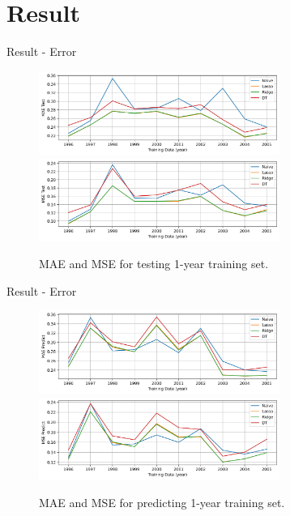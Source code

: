 \documentclass{beamer}
\begin{document}
\section{Result}

\begin{frame}{Result - Error}

  \begin{figure}[H]
    \centering
    \includegraphics[width=0.7\textwidth]{../Result/Res-1_MAE_test.jpg} \\
    \includegraphics[width=0.7\textwidth]{../Result/Res-1_MSE_test.jpg}
    \caption{MAE and MSE for testing 1-year training set.}
  \end{figure}

\end{frame}

\begin{frame}{Result - Error}

  \begin{figure}[H]
    \centering
    \includegraphics[width=0.7\textwidth]{../Result/Res-1_MAE_pred.jpg} \\
    \includegraphics[width=0.7\textwidth]{../Result/Res-1_MSE_pred.jpg}
    \caption{MAE and MSE for predicting 1-year training set.}
  \end{figure}

\end{frame}
\end{document}
